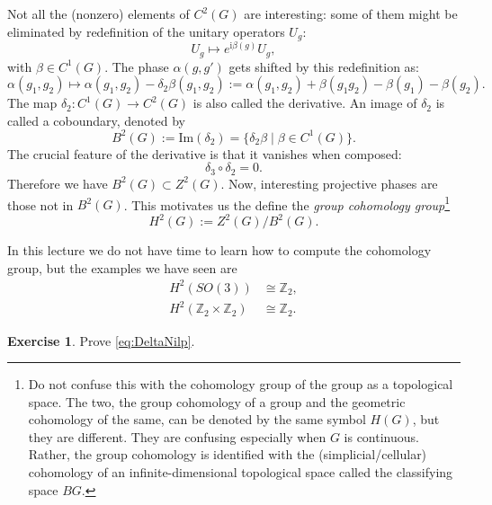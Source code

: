 \documentclass[
]{scrartcl}
\numberwithin{equation}{section}
\renewenvironment{align}{\begin{equation}\begin{aligned}}{\end{aligned}\end{equation}}
\theoremstyle{definition}
\theoremstyle{definition}
\theoremstyle{definition}
\newtheorem{exercise}{Exercise}[section]
\theoremstyle{definition}
\theoremstyle{remark}
\begin{document}
Not all the (nonzero) elements of \(C^2(G)\) are interesting: some of them might be eliminated by
redefinition of the unitary operators \(U_g\):
\begin{equation}
  \label{eq:UredefGen}
  U_g \mapsto e^{\mathrm{i}\beta(g)}U_g,
\end{equation}
with \(\beta \in C^1(G)\).
The phase \(\alpha(g,g')\) gets shifted by this redefinition as:
\begin{equation}
  \label{eq:ProjPhaseGauge}
  \alpha(g_1,g_2) \mapsto \alpha(g_1,g_2) - \delta_2 \beta (g_1,g_2) := \alpha(g_1,g_2) + \beta(g_1g_2)-\beta(g_1) - \beta(g_2).
\end{equation}
The map \(\delta_2: C^1(G) \to C^2(G)\) is also called the derivative.
An image of \(\delta_2\) is called a coboundary, denoted by
\begin{equation}
  \label{eq:GroupCoboundary}
  B^2(G) := \mathrm{Im}(\delta_2) = \{\delta_2 \beta\mid \beta \in C^1(G)\}.
\end{equation}
The crucial feature of the derivative is that it vanishes when composed:
\begin{equation}
  \label{eq:DeltaNilp}
  \delta_3\circ \delta_2 = 0.
\end{equation}
Therefore we have \(B^2(G)\subset Z^2(G)\).
Now, interesting projective phases are those not in \(B^2(G)\).
This motivates us the define the \emph{group cohomology group}\footnote{Do not confuse this with the cohomology group of the group as a topological space. The two, the group cohomology of a group and the geometric cohomology of the same, can be denoted by the same symbol \(H(G)\), but they are different. They are confusing especially when \(G\) is continuous.
  Rather, the group cohomology is identified with the (simplicial/cellular) cohomology of an infinite-dimensional topological space called the classifying space \(BG\).}
\begin{equation}
  \label{eq:GroupCohomology}
  H^2(G) := Z^2(G)/B^2(G).
\end{equation}

In this lecture we do not have time to learn how to compute the cohomology group, but the examples we have seen are
\begin{align}
  \label{eq:CohomologySO3Z2Z2}
  H^2(SO(3)) &\cong \mathbb{Z}_2,\\
  H^2(\mathbb{Z}_2\times\mathbb{Z}_2) &\cong \mathbb{Z}_2.
\end{align}

\begin{exercise}
Prove \eqref{eq:DeltaNilp}.
\end{exercise}
\end{document}

